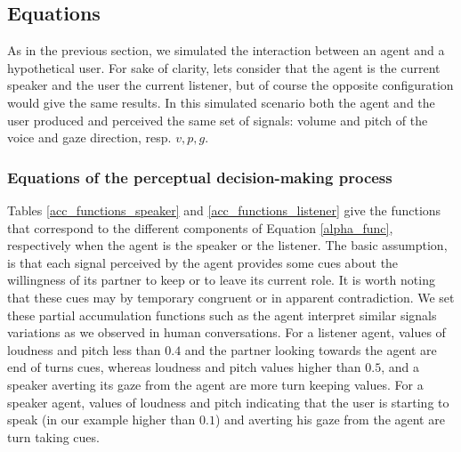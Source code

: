 
 
\subsection{Equations}

As in the previous section, we simulated the interaction between an agent and a hypothetical user. For sake of clarity, lets consider that the agent is the current speaker and the user the current listener, but of course the opposite configuration would give the same results. In this simulated scenario both the agent and the user produced and perceived the same set of signals: volume and pitch of the voice and gaze direction, resp. $v,p,g$.

\subsubsection{Equations of the perceptual decision-making process}

Tables \ref{acc_functions_speaker} and \ref{acc_functions_listener} give the functions that correspond to the different components of Equation \ref{alpha_func}, respectively when the agent is the speaker or the listener. 
The basic assumption, is that each signal perceived by the agent provides some cues about the willingness of its partner to keep or to leave its current role. It is worth noting that these cues may by temporary congruent or in apparent contradiction.
We set these partial accumulation functions such as the agent interpret similar signals variations as we observed in human conversations. For a listener agent, values of loudness and pitch less than $0.4$ and the partner looking towards the agent are end of turns cues, whereas loudness and pitch values higher than $0.5$, and a speaker averting its gaze from the agent are more turn keeping values. For a speaker agent, values of loudness and pitch indicating that the user is starting to speak (in our example higher than $0.1$) and averting his gaze from the agent are turn taking cues.

